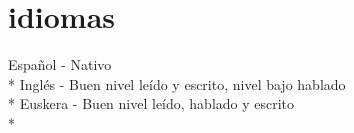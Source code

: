 \documentclass[]{friggeri-cv} %
\begin{document}
\section{idiomas}
\begin{entrylist}
Español - Nativo \\* 
Ingl\'es -  Buen nivel le\'ido y escrito, nivel bajo hablado\\* 
Euskera -  Buen nivel le\'ido, hablado y escrito\\* 
\end{entrylist}

\end{document}
